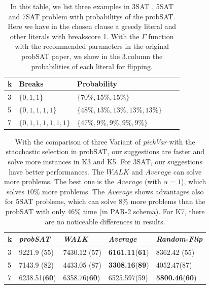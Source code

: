 \documentclass[12pt,a4paper,twoside]{scrartcl}
\numberwithin{equation}{section}
\begin{document}
\begin{table}[h!]
\label{parma}
\begin{center}
\begin{tabular}{|l|l|l|l|p{3cm}|}\hline 
k&  Breaks &          Probability  \\ \hline     
3&  $\{0, 1, 1\}$ & $\{70\%, 15\%, 15\%\}$   \\ \hline         
5 &  $\{0, 1, 1, 1, 1\}$   & $\{  48\%, 13\%, 13\%, 13\%, 13\%\}$\\ \hline
7 & $\{0, 1, 1, 1, 1, 1, 1\}$&    $\{  47\%, 9\%, 9\%, 9\%, 9\%\}$\\ \hline
\end{tabular}
\caption{In this table, we list three examples in 3SAT , 5SAT and 7SAT problem with probabilitys of the probSAT. Here we have in the chosen clause a greedy literal and other literals with breakscore 1.  With the  $\Gamma$  function with the recommended parameters in the original probSAT paper, we show in the 3.column the probabilities of each literal for flipping.}
\end{center}
\end{table}  
\begin{table}[h!]
\begin{center}
    \begin{tabular}{|l|l|l|l|p{3cm}|}
\hline 
    k &\emph{probSAT}&\emph{WALK}&\emph{Average}&\emph{Random-Flip} \\ \hline
	3&9221.9 (55)&7430.12 (57)&\textbf{6161.11}(\textbf{61})&8362.42 (55) \\ \hline
	5&7143.9 (82)&4433.05 (87)&\textbf{3308.16}(\textbf{89})&4052.47(87)\\ \hline

	7& 	6238.51(\textbf{60})& 6358.76(\textbf{60})&6525.597(59)&\textbf{5800.46}(\textbf{60})\\ \hline
	
\end{tabular}
\caption{With the comparison of three Variant of \emph{pickVar}  with the staochastic selection in probSAT, our suggestions are faster and solve more instances in K3 and K5. For 3SAT, our suggestions have better performances. The $WALK$ and $Average$ can solve more problems. The best one is the $Average$ (with $\alpha = 1$), which solves $10\%$ more problems. The $Average$ shows advantages also for 5SAT problems, which can solve $8\%$ more problems than the probSAT with only $46\%$ time (in PAR-2 schema). For K7,  there are no noticeable differences in results.}
\end{center}
\end{table} 
\end{document}
